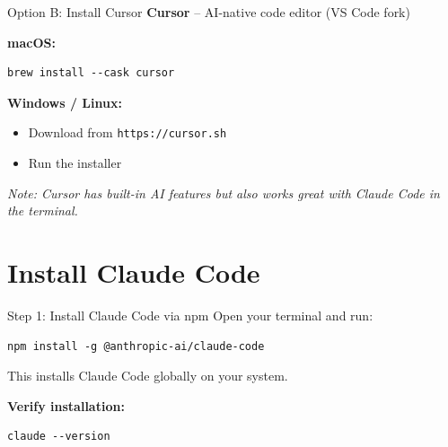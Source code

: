 \documentclass{beamer}
\begin{document}
\begin{frame}[fragile]{Option B: Install Cursor}
    \textbf{Cursor} -- AI-native code editor (VS Code fork)
    \vspace{0.3cm}

    \textbf{macOS:}
\begin{lstlisting}
brew install --cask cursor
\end{lstlisting}

    \textbf{Windows / Linux:}
    \begin{itemize}
        \item Download from \texttt{https://cursor.sh}
        \item Run the installer
    \end{itemize}

    \vspace{0.3cm}
    \textit{Note: Cursor has built-in AI features but also works great with Claude Code in the terminal.}
\end{frame}

\section{Install Claude Code}

\begin{frame}[fragile]{Step 1: Install Claude Code via npm}
    Open your terminal and run:
    \vspace{0.3cm}

\begin{lstlisting}
npm install -g @anthropic-ai/claude-code
\end{lstlisting}

    \vspace{0.5cm}
    This installs Claude Code globally on your system.

    \vspace{0.5cm}
    \textbf{Verify installation:}
\begin{lstlisting}
claude --version
\end{lstlisting}
\end{frame}
\end{document}
